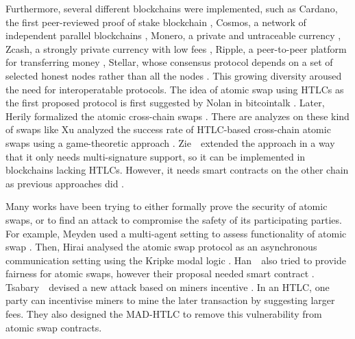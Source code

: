Furthermore, several different blockchains were implemented, such as Cardano, the first peer-reviewed proof of stake blockchain \cite{kiayias2017ouroboros}, Cosmos, a network of independent parallel blockchains \cite{kwon2018network}, Monero, a private and untraceable currency \cite{van2013cryptonote}, Zcash, a strongly private currency with low fees \cite{sasson2014zerocash}, Ripple, a peer-to-peer platform for transferring money \cite{schwartz2014ripple}, Stellar, whose consensus protocol depends on a set of selected honest nodes rather than all the nodes \cite{mazieres2015stellar}. This growing diversity aroused the need for interoperatable protocols. The idea of atomic swap using HTLCs as the first proposed protocol is first suggested by Nolan in bitcointalk \cite{htlc-btctalk}. Later, Herily formalized the atomic cross-chain swaps \cite{herlihy2018atomic}. There are analyzes on these kind of swaps like Xu \etal analyzed the success rate of HTLC-based cross-chain atomic swaps using a game-theoretic approach \cite{xu2020game}. Zie~\etal~extended the approach in a way that it only needs multi-signature support, so it can be implemented in blockchains lacking HTLCs. However, it needs smart contracts on the other chain as previous approaches did  \cite{10.1007/978-3-030-31500-9_14}.

Many works have been trying to either formally prove the security of atomic swaps, or to find an attack to compromise the safety of its participating parties. For example, Meyden used a multi-agent setting to assess functionality of atomic swap \cite{van2019specification}. Then, Hirai analysed the atomic swap protocol as an asynchronous communication setting using the Kripke modal logic \cite{10.1007/978-3-030-03427-6_29}. Han~\etal~also tried to provide fairness for atomic swaps, however their proposal needed smart contract \cite{han2019optionality}.
Tsabary~\etal~devised a new attack based on miners incentive \cite{Tsabary2020MADHTLCBH}. In an HTLC, one party can incentivise miners to mine the later transaction by suggesting larger fees. They also designed the MAD-HTLC to remove this vulnerability from atomic swap contracts.

